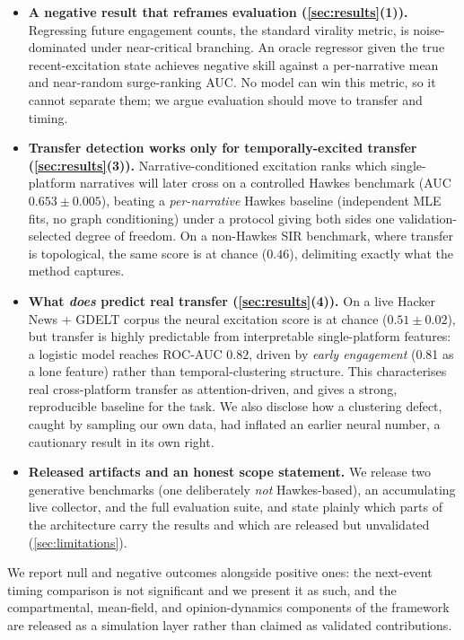 \documentclass[11pt]{article}
\begin{document}
\begin{itemize}[leftmargin=*,noitemsep,topsep=2pt]
  \item \textbf{A negative result that reframes evaluation
    (\cref{sec:results}(1)).} Regressing future engagement counts, the
    standard virality metric, is noise-dominated under near-critical
    branching. An oracle regressor given the true recent-excitation state
    achieves negative skill against a per-narrative mean and near-random
    surge-ranking AUC. No model can win this metric, so it cannot separate
    them; we argue evaluation should move to transfer and timing.
  \item \textbf{Transfer detection works only for temporally-excited transfer
    (\cref{sec:results}(3)).} Narrative-conditioned excitation ranks which
    single-platform narratives will later cross on a controlled Hawkes
    benchmark (AUC $0.653 \pm 0.005$), beating a \emph{per-narrative} Hawkes
    baseline (independent MLE fits, no graph conditioning) under a
    protocol giving both sides one validation-selected degree of freedom. On a
    non-Hawkes SIR benchmark, where transfer is topological, the same score is
    at chance ($0.46$), delimiting exactly what the method captures.
  \item \textbf{What \emph{does} predict real transfer
    (\cref{sec:results}(4)).} On a live Hacker News + GDELT corpus the neural
    excitation score is at chance ($0.51 \pm 0.02$), but transfer is highly
    predictable from interpretable single-platform features: a logistic model
    reaches ROC-AUC $0.82$, driven by \emph{early engagement} (0.81 as a lone
    feature) rather than temporal-clustering structure. This characterises
    real cross-platform transfer as attention-driven, and gives a strong,
    reproducible baseline for the task. We also disclose how a clustering
    defect, caught by sampling our own data, had inflated an earlier
    neural number, a cautionary result in its own right.
  \item \textbf{Released artifacts and an honest scope statement.} We release
    two generative benchmarks (one deliberately \emph{not} Hawkes-based), an
    accumulating live collector, and the full evaluation suite, and state
    plainly which parts of the architecture carry the results and which are
    released but unvalidated (\cref{sec:limitations}).
\end{itemize}

We report null and negative outcomes alongside positive ones: the next-event
timing comparison is not significant and we present it as such, and the
compartmental, mean-field, and opinion-dynamics components of the framework
are released as a simulation layer rather than claimed as validated
contributions.
\end{document}
